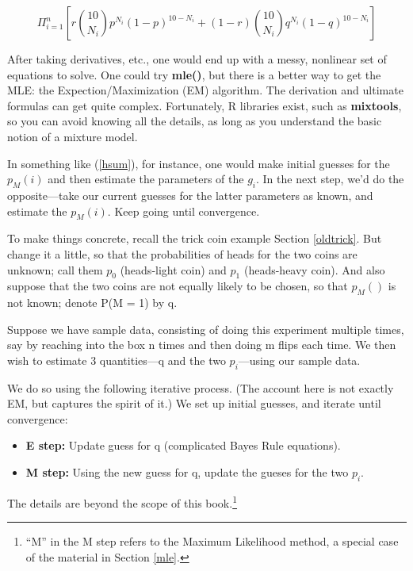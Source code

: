 \documentclass[11pt]{article}
\begin{document}
\begin{equation}
\Pi_{i=1}^n
\left [ r \binom{10}{N_i} p^{N_i} (1-p)^{10-N_i} +
(1-r) \binom{10}{N_i} q^{N_i} (1-q)^{10-N_i}
\right ]
\end{equation}

After taking derivatives, etc., one would end up with a messy, nonlinear
set of equations to solve.  One could try {\bf mle()}, but there is a
better way to get the MLE: the Expection/Maximization (EM) algorithm.
The derivation and ultimate formulas can get quite complex.
Fortunately, R libraries exist, such as {\bf mixtools}, so you can avoid
knowing all the details, as long as you understand the basic notion of a
mixture model.  

In something like (\ref{hsum}), for instance, one would make initial
guesses for the $p_M(i)$ and then estimate the parameters of the $g_i$.
In the next step, we'd do the opposite---take our current guesses for
the latter parameters as known, and estimate the $p_M(i)$.  Keep going
until convergence.

To make things concrete, recall the trick coin example Section
\ref{oldtrick}.  But change it a little, so that the probabilities of
heads for the two coins are unknown; call them $p_0$ (heads-light coin)
and $p_1$ (heads-heavy coin).  And also suppose that the two coins are
not equally likely to be chosen, so that $p_M()$ is not known; denote
P(M = 1) by q.

Suppose we have sample data, consisting of doing this experiment
multiple times, say by reaching into the box n times and then doing m
flips each time.  We then wish to estimate 3 quantities---q and the two
$p_i$---using our sample data.  

We do so using the following iterative process.  (The account here is
not exactly EM, but captures the spirit of it.) We set up initial
guesses, and iterate until convergence:

\begin{itemize}

\item {\bf E step:} Update guess for q (complicated Bayes Rule equations).

\item {\bf M step:} Using the new guess for q, update the gueses for the
two $p_i$.

\end{itemize}

The details are beyond the scope of this book.\footnote{``M'' in the M
step refers to the Maximum Likelihood method, a special case of the
material in Section \ref{mle}.}
\end{document}
